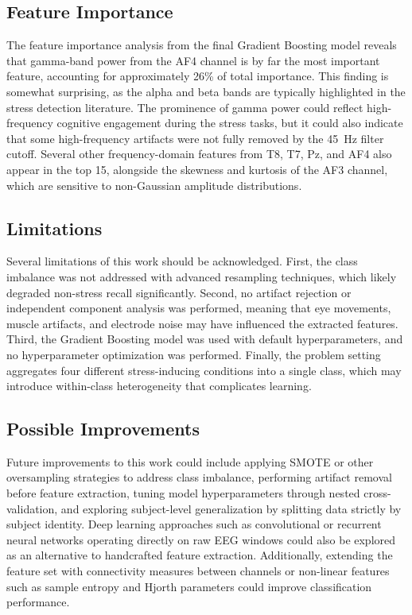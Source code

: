 \documentclass[12pt,a4paper]{article}
\begin{document}
	\subsection{Feature Importance}

	The feature importance analysis from the final Gradient Boosting model reveals that gamma-band power from the AF4 channel is by far the most important feature, accounting for approximately 26\% of total importance. This finding is somewhat surprising, as the alpha and beta bands are typically highlighted in the stress detection literature. The prominence of gamma power could reflect high-frequency cognitive engagement during the stress tasks, but it could also indicate that some high-frequency artifacts were not fully removed by the 45~Hz filter cutoff. Several other frequency-domain features from T8, T7, Pz, and AF4 also appear in the top 15, alongside the skewness and kurtosis of the AF3 channel, which are sensitive to non-Gaussian amplitude distributions.

	\subsection{Limitations}

	Several limitations of this work should be acknowledged. First, the class imbalance was not addressed with advanced resampling techniques, which likely degraded non-stress recall significantly. Second, no artifact rejection or independent component analysis was performed, meaning that eye movements, muscle artifacts, and electrode noise may have influenced the extracted features. Third, the Gradient Boosting model was used with default hyperparameters, and no hyperparameter optimization was performed. Finally, the problem setting aggregates four different stress-inducing conditions into a single class, which may introduce within-class heterogeneity that complicates learning.

	\subsection{Possible Improvements}

	Future improvements to this work could include applying SMOTE or other oversampling strategies to address class imbalance, performing artifact removal before feature extraction, tuning model hyperparameters through nested cross-validation, and exploring subject-level generalization by splitting data strictly by subject identity. Deep learning approaches such as convolutional or recurrent neural networks operating directly on raw EEG windows could also be explored as an alternative to handcrafted feature extraction. Additionally, extending the feature set with connectivity measures between channels or non-linear features such as sample entropy and Hjorth parameters could improve classification performance.
	
\end{document}
